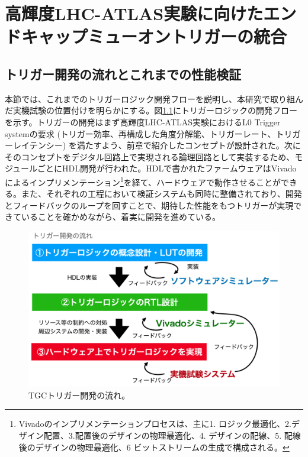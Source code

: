 \chapter{高輝度LHC-ATLAS実験に向けたエンドキャップミューオントリガーの統合}
\label{chap_TriggerIntegration}

\section{トリガー開発の流れとこれまでの性能検証}
\label{sec_TriggerTestSystem}
本節では、これまでのトリガーロジック開発フローを説明し、本研究で取り組んだ実機試験の位置付けを明らかにする。図\ref{Develop_flow}にトリガーロジックの開発フローを示す。トリガーの開発はまず高輝度LHC-ATLAS実験におけるL0 Trigger systemの要求 (トリガー効率、再構成した角度分解能、トリガーレート、トリガーレイテンシー) を満たすよう、前章で紹介したコンセプトが設計された。次にそのコンセプトをデジタル回路上で実現される論理回路として実装するため、モジュールごとにHDL開発が行われた。HDLで書かれたファームウェアはVivadoによるインプリメンテーション\footnote{Vivadoのインプリメンテーションプロセスは、主に1. ロジック最適化、2.デザイン配置、3.配置後のデザインの物理最適化、4. デザインの配線、5. 配線後のデザインの物理最適化、6 ビットストリームの生成で構成される。}を経て、ハードウェアで動作させることができる。また、それぞれの工程において検証システムも同時に整備されており、開発とフィードバックのループを回すことで、期待した性能をもつトリガーが実現できていることを確かめながら、着実に開発を進めている。

\begin{figure} 
\centering
\includegraphics[width=16cm]{fig/Test/Develop_flow.png}
\caption[TGCトリガー開発の流れ]{TGCトリガー開発の流れ。}
\label{Develop_flow}
\end{figure}

